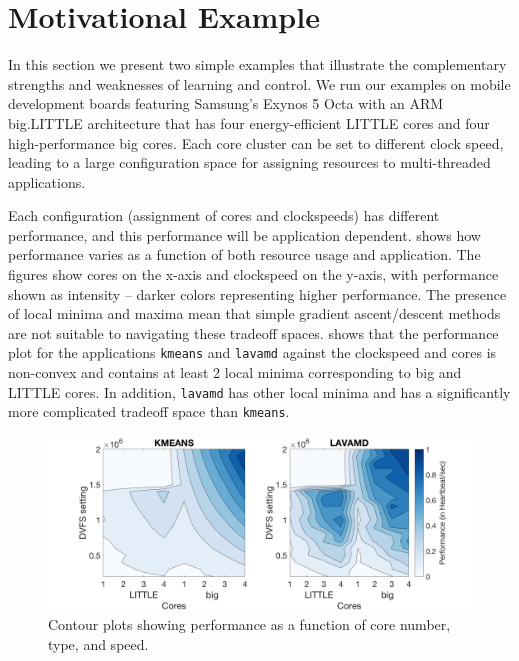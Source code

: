 \section{Motivational Example}
\label{sec:example}

In this section we present two simple examples that illustrate the
complementary strengths and weaknesses of learning and control.  We
run our examples on mobile development boards featuring Samsung's
Exynos 5 Octa with an ARM big.LITTLE architecture that has four
energy-efficient LITTLE cores and four high-performance big cores.
Each core cluster can be set to different clock speed, leading to a
large configuration space for assigning resources to multi-threaded
applications.

Each configuration (assignment of cores and clockspeeds) has different
performance, and this performance will be application dependent.
 shows how performance varies as a function of both
resource usage and application.  The figures show cores on the x-axis
and clockspeed on the y-axis, with performance shown as intensity --
darker colors representing higher performance. The presence of local
minima and maxima mean that simple gradient ascent/descent methods are
not suitable to navigating these tradeoff spaces.
 shows that the performance plot for the
applications \texttt{kmeans} and \texttt{lavamd} against the
clockspeed and cores is non-convex and contains at least 2 local
minima corresponding to big and LITTLE cores.  In addition,
\texttt{lavamd} has other local minima and has a significantly more
complicated tradeoff space than \texttt{kmeans}. 


\begin{figure}
\centering
\includegraphics[width=\columnwidth]{figures/performance-contour2.png}
\caption{Contour plots showing performance as a function of core
  number, type, and speed.}
  \label{fig:contour}
\end{figure}


